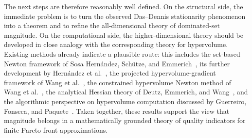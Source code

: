 \documentclass{article}
\theoremstyle{definition}
\newcommand{\1}{\mathbf{1}}
\begin{document}
The next steps are therefore reasonably well defined. On the structural side, the immediate problem is to turn the observed Das--Dennis stationarity phenomenon into a theorem and to refine the all-dimensional theory of dominated-set magnitude. On the computational side, the higher-dimensional theory should be developed in close analogy with the corresponding theory for hypervolume. Existing methods already indicate a plausible route: this includes the set-based Newton framework of Sosa Hernández, Schütze, and Emmerich~\cite{SosaHernandezSchuetzeEmmerich2014}, its further development by Hernández et al.~\cite{HernandezSchuetzeWangDeutzEmmerich2018}, the projected hypervolume-gradient framework of Wang et al.~\cite{WangDeutzBackEmmerich2017}, the constrained hypervolume Newton method of Wang et al.~\cite{WangEtAl2023Constraints}, the analytical Hessian theory of Deutz, Emmerich, and Wang~\cite{DeutzEmmerichWang2023}, and the algorithmic perspective on hypervolume computation discussed by Guerreiro, Fonseca, and Paquete~\cite{GuerreiroFonsecaPaquete2021}. Taken together, these results support the view that magnitude belongs in a mathematically grounded theory of quality indicators for finite Pareto front approximations.
\end{document}
